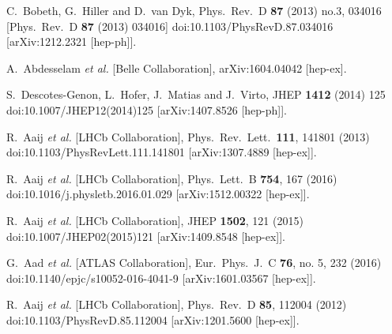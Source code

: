 \documentclass{PoS}
\begin{document}
\begin{thebibliography}{99}
  C.~Bobeth, G.~Hiller and D.~van Dyk,
  Phys.\ Rev.\ D {\bf 87} (2013) no.3,  034016
   [Phys.\ Rev.\ D {\bf 87} (2013) 034016]
  doi:10.1103/PhysRevD.87.034016
  [arXiv:1212.2321 [hep-ph]].

  A.~Abdesselam {\it et al.} [Belle Collaboration],
  arXiv:1604.04042 [hep-ex].

  S.~Descotes-Genon, L.~Hofer, J.~Matias and J.~Virto,
  JHEP {\bf 1412} (2014) 125
  doi:10.1007/JHEP12(2014)125
  [arXiv:1407.8526 [hep-ph]].

  R.~Aaij {\it et al.} [LHCb Collaboration],
  Phys.\ Rev.\ Lett.\  {\bf 111}, 141801 (2013)
  doi:10.1103/PhysRevLett.111.141801
  [arXiv:1307.4889 [hep-ex]].

  R.~Aaij {\it et al.} [LHCb Collaboration],
  Phys.\ Lett.\ B {\bf 754}, 167 (2016)
  doi:10.1016/j.physletb.2016.01.029
  [arXiv:1512.00322 [hep-ex]].

  R.~Aaij {\it et al.} [LHCb Collaboration],
  JHEP {\bf 1502}, 121 (2015)
  doi:10.1007/JHEP02(2015)121
  [arXiv:1409.8548 [hep-ex]].

  G.~Aad {\it et al.} [ATLAS Collaboration],
  Eur.\ Phys.\ J.\ C {\bf 76}, no. 5, 232 (2016)
  doi:10.1140/epjc/s10052-016-4041-9
  [arXiv:1601.03567 [hep-ex]].

  R.~Aaij {\it et al.} [LHCb Collaboration],
  Phys.\ Rev.\ D {\bf 85}, 112004 (2012)
  doi:10.1103/PhysRevD.85.112004
  [arXiv:1201.5600 [hep-ex]].


\end{thebibliography}
\end{document}
